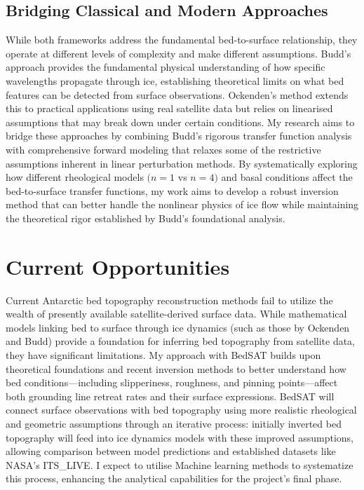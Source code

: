 \subsection{Bridging Classical and Modern Approaches}
While both frameworks address the fundamental bed-to-surface relationship, they operate at different levels of complexity and make different assumptions. Budd's approach provides the fundamental physical understanding of how specific wavelengths propagate through ice, establishing theoretical limits on what bed features can be detected from surface observations. Ockenden's method extends this to practical applications using real satellite data but relies on linearised assumptions that may break down under certain conditions. My research aims to bridge these approaches by combining Budd's rigorous transfer function analysis with comprehensive forward modeling that relaxes some of the restrictive assumptions inherent in linear perturbation methods. By systematically exploring how different rheological models $(n = 1$ vs $n = 4)$ and basal conditions affect the bed-to-surface transfer functions, my work aims to develop a robust inversion method that can better handle the nonlinear physics of ice flow while maintaining the theoretical rigor established by Budd's foundational analysis.

\section{Current Opportunities}
Current Antarctic bed topography reconstruction methods fail to utilize the wealth of presently available satellite-derived surface data. While mathematical models linking bed to surface through ice dynamics (such as those by Ockenden and Budd) provide a foundation for inferring bed topography from satellite data, they have significant limitations. My approach with BedSAT builds upon theoretical foundations and recent inversion methods to better understand how bed conditions—including slipperiness, roughness, and pinning points—affect both grounding line retreat rates and their surface expressions. BedSAT will connect surface observations with bed topography using more realistic rheological and geometric assumptions through an iterative process: initially inverted bed topography will feed into ice dynamics models with these improved assumptions, allowing comparison between model predictions and established datasets like NASA's ITS\_LIVE. I expect to utilise Machine learning methods to systematize this process, enhancing the analytical capabilities for the project's final phase.
